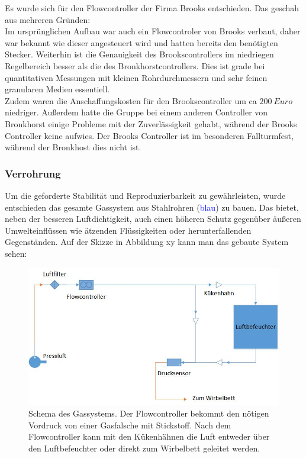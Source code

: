 Es wurde sich für den Flowcontroller der Firma Brooks entschieden. Das geschah aus mehreren Gründen: \\
Im ursprünglichen Aufbau war auch ein Flowcontroler von Brooks verbaut, daher war bekannt wie dieser angesteuert wird und hatten bereits den benötigten Stecker. Weiterhin ist die Genauigkeit des Brookscontrollers im niedriegen Regelbereich besser als die des Bronkhorstcontrollers. Dies ist grade bei quantitativen Messungen mit kleinen Rohrdurchmessern und sehr feinen granularen Medien essentiell. \\
Zudem waren die Anschaffungskosten für den Brookscontroller um ca $\SI{200}{Euro}$ niedriger. Außerdem hatte die Gruppe bei einem anderen Controller von Bronkhorst einige Probleme mit der Zuverlässigkeit gehabt, während der Brooks Controller keine aufwies. Der Brooks Controller ist im besonderen Fallturmfest, während der Bronkhost dies nicht ist.


\subsubsection{Verrohrung}

Um die geforderte Stabilität und Reproduzierbarkeit zu gewährleisten, wurde entschieden das gesamte Gassystem aus Stahlrohren (\textcolor{blue}{blau}) zu bauen. Das bietet, neben der besseren Luftdichtigkeit, auch einen höheren Schutz gegenüber äußeren Umwelteinflüssen wie ätzenden Flüssigkeiten oder herunterfallenden Gegenständen.
Auf der Skizze in Abbildung xy kann man das gebaute System sehen:
\hfill \\

\begin{figure}[h!]
	\begin{center}
		\includegraphics[scale=0.6]{Aufbau_Gassystem.jpg}
		\caption[Schema Gassystem]{Schema des Gassystems. Der Flowcontroller bekommt den nötigen Vordruck von einer Gasfalsche mit Stickstoff. Nach dem Flowcontroller kann mit den Kükenhähnen die Luft entweder über den Luftbefeuchter oder direkt zum Wirbelbett geleitet werden.}
	\end{center}
\end{figure}



